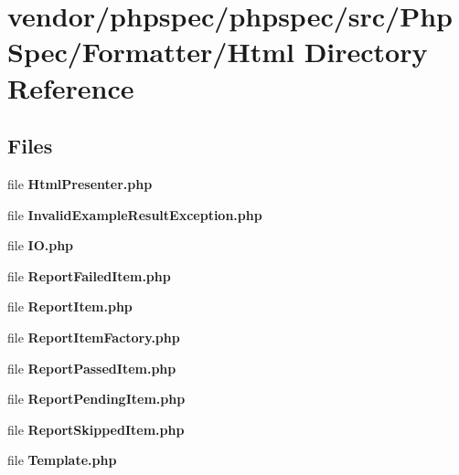 \section{vendor/phpspec/phpspec/src/\+Php\+Spec/\+Formatter/\+Html Directory Reference}
\label{dir_5d8cb16feb090ede1871bb30d9e605e9}
\subsection*{Files}
\begin{DoxyCompactItemize}
\item 
file {\bf Html\+Presenter.\+php}
\item 
file {\bf Invalid\+Example\+Result\+Exception.\+php}
\item 
file {\bf I\+O.\+php}
\item 
file {\bf Report\+Failed\+Item.\+php}
\item 
file {\bf Report\+Item.\+php}
\item 
file {\bf Report\+Item\+Factory.\+php}
\item 
file {\bf Report\+Passed\+Item.\+php}
\item 
file {\bf Report\+Pending\+Item.\+php}
\item 
file {\bf Report\+Skipped\+Item.\+php}
\item 
file {\bf Template.\+php}
\end{DoxyCompactItemize}

